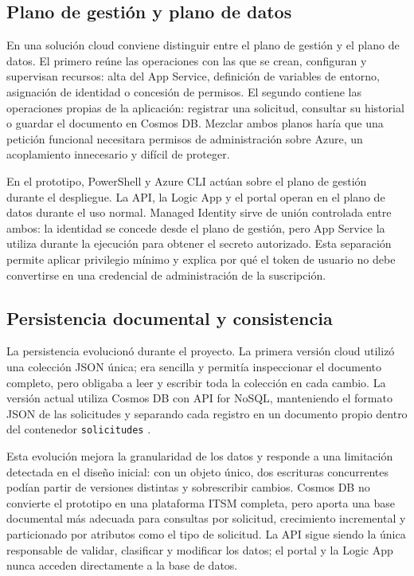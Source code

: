 \subsection{Plano de gestión y plano de datos}

En una solución cloud conviene distinguir entre el plano de gestión y el plano de datos. El primero reúne las operaciones con las que se crean, configuran y supervisan recursos: alta del App Service, definición de variables de entorno, asignación de identidad o concesión de permisos. El segundo contiene las operaciones propias de la aplicación: registrar una solicitud, consultar su historial o guardar el documento en Cosmos DB. Mezclar ambos planos haría que una petición funcional necesitara permisos de administración sobre Azure, un acoplamiento innecesario y difícil de proteger.

En el prototipo, PowerShell y Azure CLI actúan sobre el plano de gestión durante el despliegue. La API, la Logic App y el portal operan en el plano de datos durante el uso normal. Managed Identity sirve de unión controlada entre ambos: la identidad se concede desde el plano de gestión, pero App Service la utiliza durante la ejecución para obtener el secreto autorizado. Esta separación permite aplicar privilegio mínimo y explica por qué el token de usuario no debe convertirse en una credencial de administración de la suscripción.

\subsection{Persistencia documental y consistencia}

La persistencia evolucionó durante el proyecto. La primera versión cloud utilizó una colección JSON única; era sencilla y permitía inspeccionar el documento completo, pero obligaba a leer y escribir toda la colección en cada cambio. La versión actual utiliza Cosmos DB con API for NoSQL, manteniendo el formato JSON de las solicitudes y separando cada registro en un documento propio dentro del contenedor \texttt{solicitudes} \cite{azure_cosmos_overview,azure_cosmos_python}.

Esta evolución mejora la granularidad de los datos y responde a una limitación detectada en el diseño inicial: con un objeto único, dos escrituras concurrentes podían partir de versiones distintas y sobrescribir cambios. Cosmos DB no convierte el prototipo en una plataforma ITSM completa, pero aporta una base documental más adecuada para consultas por solicitud, crecimiento incremental y particionado por atributos como el tipo de solicitud. La API sigue siendo la única responsable de validar, clasificar y modificar los datos; el portal y la Logic App nunca acceden directamente a la base de datos.

